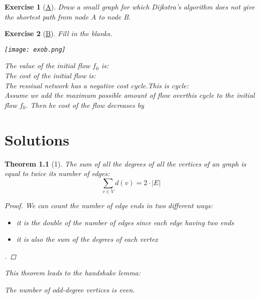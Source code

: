 \documentclass[10pt]{report}
\numberwithin{dummy}{section}
\theoremstyle{ocrenumbox}
\newtheorem{definitionT}{Exercise}[]
\newtheorem{definitionTTT}{Theorem}[]
\theoremstyle{grayman}
\newenvironment{exo}{\begin{dBox}\begin{definitionT}}{\end{definitionT}\end{dBox}}
\newenvironment{thm}{\begin{tBox}\begin{definitionTTT}}{\end{definitionTTT}\end{tBox}}
\begin{document}
\begin{exo}[\hypertarget{exoa}{\hyperlink{sola}{A}}] 
Draw a small graph for which Dijkstra’s algorithm does not
give the shortest path from node A to node B.
\end{exo} 

\begin{exo}[\hypertarget{exoa}{\hyperlink{sola}{B}}] 
Fill in the blanks.
\begin{center}
    \texttt{[image: exob.png]}
\end{center}
The value of the initial flow $f_0$ is: \\
The cost of the initial flow is: \\
The ressiual network has a negative cost cycle.This is cycle: \\
Assume we add the maximum possible amount of flow overthis cycle to the initial flow $f_0$. Then he cost of the flow decreases by 
\end{exo} 














\chapter{Solutions}


\begin{thm}[1]
The sum of all the degrees of all the vertices of an graph is equal to twice its number of edges: 
\[\sum_{v\in V} d(v) = 2\cdot\lvert E \rvert \]
\begin{proof} 
We can count the number of edge ends in two different ways:
\begin{itemize}
    \item it is the double of the number of edges since each edge having two ends 
    \item it is also the sum of the degrees of each vertex
\end{itemize}.
\end{proof}
This theorem leads to the handshake lemma: 
\begin{center}
    The number of odd-degree vertices is even.
\end{center}
\end{thm}
\end{document}
